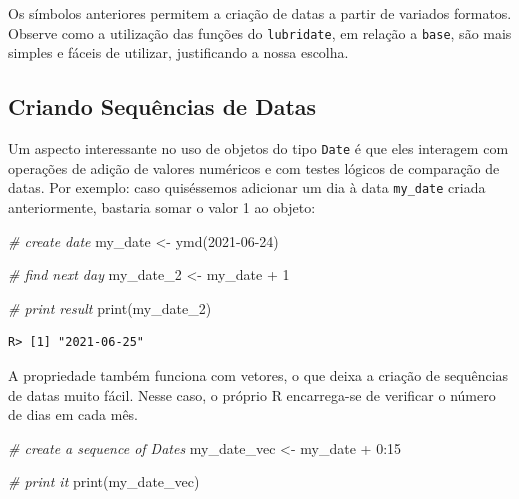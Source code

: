 \documentclass[
  11pt,
]{book}
\newenvironment{Shaded}{\begin{snugshade}}{\end{snugshade}}
\newcommand{\CommentTok}[1]{\textcolor[rgb]{0.37,0.37,0.37}{\textit{#1}}}
\newcommand{\DecValTok}[1]{\textcolor[rgb]{0.06,0.06,0.06}{#1}}
\newcommand{\FunctionTok}[1]{\textcolor[rgb]{0,0,0}{#1}}
\newcommand{\NormalTok}[1]{#1}
\newcommand{\OtherTok}[1]{\textcolor[rgb]{0.37,0.37,0.37}{#1}}
\newcommand{\SpecialCharTok}[1]{\textcolor[rgb]{0,0,0}{#1}}
\newcommand{\StringTok}[1]{\textcolor[rgb]{0.5,0.5,0.5}{#1}}
\begin{document}
Os símbolos anteriores permitem a criação de datas a partir de variados formatos. Observe como a utilização das funções do \texttt{lubridate}, em relação a \texttt{base}, são mais simples e fáceis de utilizar, justificando a nossa escolha.

\hypertarget{criando-sequuxeancias-de-datas}{%
\subsection{Criando Sequências de Datas}\label{criando-sequuxeancias-de-datas}}

Um aspecto interessante no uso de objetos do tipo \texttt{Date} é que eles interagem com operações de adição de valores numéricos e com testes lógicos de comparação de datas. Por exemplo: caso quiséssemos adicionar um dia à data \texttt{my\_date} criada anteriormente, bastaria somar o valor 1 ao objeto:

\begin{Shaded}
\begin{Highlighting}[]
\CommentTok{\# create date}
\NormalTok{my\_date }\OtherTok{\textless{}{-}} \FunctionTok{ymd}\NormalTok{(}\StringTok{\textquotesingle{}2021{-}06{-}24\textquotesingle{}}\NormalTok{)}

\CommentTok{\# find next day}
\NormalTok{my\_date\_2 }\OtherTok{\textless{}{-}}\NormalTok{ my\_date }\SpecialCharTok{+} \DecValTok{1}

\CommentTok{\# print result}
\FunctionTok{print}\NormalTok{(my\_date\_2)}
\end{Highlighting}
\end{Shaded}

\begin{verbatim}
R> [1] "2021-06-25"
\end{verbatim}

A propriedade também funciona com vetores, o que deixa a criação de sequências de datas muito fácil. Nesse caso, o próprio R encarrega-se de verificar o número de dias em cada mês.

\begin{Shaded}
\begin{Highlighting}[]
\CommentTok{\# create a sequence of Dates}
\NormalTok{my\_date\_vec }\OtherTok{\textless{}{-}}\NormalTok{ my\_date }\SpecialCharTok{+} \DecValTok{0}\SpecialCharTok{:}\DecValTok{15}

\CommentTok{\# print it}
\FunctionTok{print}\NormalTok{(my\_date\_vec)}
\end{Highlighting}
\end{Shaded}
\end{document}
